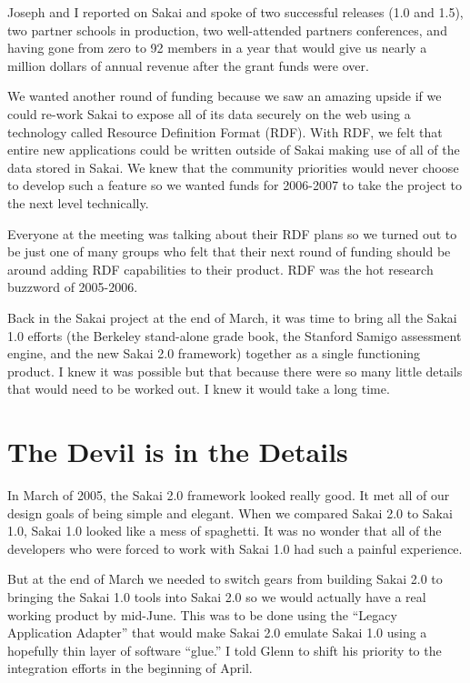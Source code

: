 \documentclass[12pt]{book}
\begin{document}
Joseph and I reported on Sakai and spoke of two successful
releases (1.0 and 1.5), two partner schools in production,
two well-attended partners conferences, and having gone
from zero to 92 members in a year that would give us nearly
a million dollars of annual revenue after the grant funds
were over.

We wanted another round of funding because we saw an
amazing upside if we could re-work Sakai to expose all of
its data securely on the web using a technology called
Resource Definition Format (RDF).  With RDF, we felt that
entire new applications could be written outside of Sakai
making use of all of the data stored in Sakai.   We knew
that the community priorities would never choose to develop
such a feature so we wanted funds for 2006-2007 to take the
project to the next level technically.

Everyone at the meeting was talking about their RDF plans
so we turned out to be just one of many groups who felt
that their next round of funding should be around adding RDF
capabilities to their product.  RDF was the hot research
buzzword of 2005-2006.

Back in the Sakai project at the end of March, it was time
to bring all the Sakai 1.0 efforts (the Berkeley stand-alone grade book,
the Stanford Samigo assessment engine, and the new Sakai 2.0
framework) together as a single functioning product.
I knew it was possible but that because there were so many little
details that would need to be worked out.  I knew it would take
a long time.

\chapter{The Devil is in the Details}

In March of 2005, the Sakai 2.0 framework looked really good.
It met all of our design goals of being simple and elegant.
When we compared Sakai 2.0 to Sakai 1.0, Sakai 1.0 looked
like a mess of spaghetti.  It was no wonder that all
of the developers who were forced to work with Sakai 1.0
had such a painful experience.

But at the end of March we needed to switch gears from
building Sakai 2.0 to bringing the Sakai 1.0 tools
into Sakai 2.0 so we would actually have a real working product
by mid-June.  This was to be done using the ``Legacy
Application Adapter'' that would make Sakai 2.0 emulate
Sakai 1.0 using a hopefully thin layer of
software ``glue.''  I told Glenn to shift his priority
to the integration efforts in the beginning of April.
\end{document}
